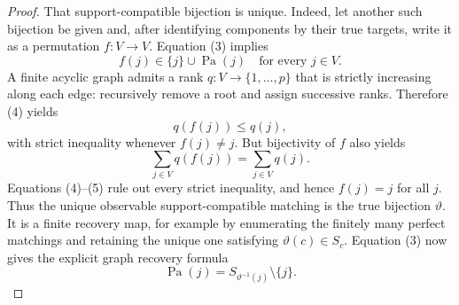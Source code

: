 \documentclass{article}
\begin{document}
\begin{proof}
That support-compatible bijection is unique.  Indeed, let another such
bijection be given and, after identifying components by their true targets,
write it as a permutation \(f:V\to V\).  Equation (3) implies
\[
 f(j)\in\{j\}\cup\operatorname{Pa}(j)
 \quad\text{for every }j\in V.                          \tag{4}
\]
A finite acyclic graph admits a rank \(q:V\to\{1,\ldots,p\}\) that is
strictly increasing along each edge: recursively remove a root and assign
successive ranks.  Therefore (4) yields
\[
 q(f(j))\leq q(j),
\]
with strict inequality whenever \(f(j)\neq j\).  But bijectivity of \(f\)
also yields
\[
 \sum_{j\in V}q(f(j))=\sum_{j\in V}q(j).                \tag{5}
\]
Equations (4)--(5) rule out every strict inequality, and hence
\(f(j)=j\) for all \(j\).  Thus the unique observable support-compatible
matching is the true bijection \(\vartheta\).  It is a finite recovery map,
for example by enumerating the finitely many perfect matchings and retaining
the unique one satisfying \(\vartheta(c)\in S_c\).  Equation (3) now gives
the explicit graph recovery formula
\[
 \operatorname{Pa}(j)
 =S_{\vartheta^{-1}(j)}\setminus\{j\}.                  \tag{6}
\]


\end{proof}
\end{document}

